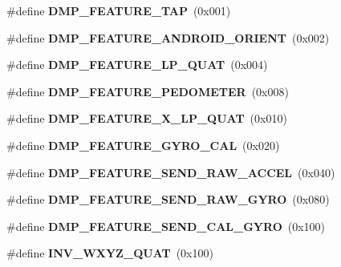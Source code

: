 \begin{DoxyCompactItemize}
\item 
\#define {\bfseries D\+M\+P\+\_\+\+F\+E\+A\+T\+U\+R\+E\+\_\+\+T\+AP}~(0x001)\hypertarget{group___d_r_i_v_e_r_s_ga87fac39cf95e2c56afdf507a986fa00b}{}\label{group___d_r_i_v_e_r_s_ga87fac39cf95e2c56afdf507a986fa00b}

\item 
\#define {\bfseries D\+M\+P\+\_\+\+F\+E\+A\+T\+U\+R\+E\+\_\+\+A\+N\+D\+R\+O\+I\+D\+\_\+\+O\+R\+I\+E\+NT}~(0x002)\hypertarget{group___d_r_i_v_e_r_s_gaf2b250fc928390d562f7bd80300ce419}{}\label{group___d_r_i_v_e_r_s_gaf2b250fc928390d562f7bd80300ce419}

\item 
\#define {\bfseries D\+M\+P\+\_\+\+F\+E\+A\+T\+U\+R\+E\+\_\+\+L\+P\+\_\+\+Q\+U\+AT}~(0x004)\hypertarget{group___d_r_i_v_e_r_s_gabf442c0477f8f7704a8094519ddfe38e}{}\label{group___d_r_i_v_e_r_s_gabf442c0477f8f7704a8094519ddfe38e}

\item 
\#define {\bfseries D\+M\+P\+\_\+\+F\+E\+A\+T\+U\+R\+E\+\_\+\+P\+E\+D\+O\+M\+E\+T\+ER}~(0x008)\hypertarget{group___d_r_i_v_e_r_s_gabcf6a5bc9703782d711d0c6ba92ade85}{}\label{group___d_r_i_v_e_r_s_gabcf6a5bc9703782d711d0c6ba92ade85}

\item 
\#define {\bfseries D\+M\+P\+\_\+\+F\+E\+A\+T\+U\+R\+E\+\_\+X\+\_\+\+L\+P\+\_\+\+Q\+U\+AT}~(0x010)\hypertarget{group___d_r_i_v_e_r_s_gae879a3c9729f9e1be5e6d7c9211c69c0}{}\label{group___d_r_i_v_e_r_s_gae879a3c9729f9e1be5e6d7c9211c69c0}

\item 
\#define {\bfseries D\+M\+P\+\_\+\+F\+E\+A\+T\+U\+R\+E\+\_\+\+G\+Y\+R\+O\+\_\+\+C\+AL}~(0x020)\hypertarget{group___d_r_i_v_e_r_s_gaaf0ac890c1f83106c08b722f1e865fdb}{}\label{group___d_r_i_v_e_r_s_gaaf0ac890c1f83106c08b722f1e865fdb}

\item 
\#define {\bfseries D\+M\+P\+\_\+\+F\+E\+A\+T\+U\+R\+E\+\_\+\+S\+E\+N\+D\+\_\+\+R\+A\+W\+\_\+\+A\+C\+C\+EL}~(0x040)\hypertarget{group___d_r_i_v_e_r_s_ga9eeb257febe4a305df7ad4cf31dc2755}{}\label{group___d_r_i_v_e_r_s_ga9eeb257febe4a305df7ad4cf31dc2755}

\item 
\#define {\bfseries D\+M\+P\+\_\+\+F\+E\+A\+T\+U\+R\+E\+\_\+\+S\+E\+N\+D\+\_\+\+R\+A\+W\+\_\+\+G\+Y\+RO}~(0x080)\hypertarget{group___d_r_i_v_e_r_s_gaa59d3ed6f0cbc66e99ce637546434b34}{}\label{group___d_r_i_v_e_r_s_gaa59d3ed6f0cbc66e99ce637546434b34}

\item 
\#define {\bfseries D\+M\+P\+\_\+\+F\+E\+A\+T\+U\+R\+E\+\_\+\+S\+E\+N\+D\+\_\+\+C\+A\+L\+\_\+\+G\+Y\+RO}~(0x100)\hypertarget{group___d_r_i_v_e_r_s_ga40462c6fd55b04b2f79723dd737ee795}{}\label{group___d_r_i_v_e_r_s_ga40462c6fd55b04b2f79723dd737ee795}

\item 
\#define {\bfseries I\+N\+V\+\_\+\+W\+X\+Y\+Z\+\_\+\+Q\+U\+AT}~(0x100)\hypertarget{group___d_r_i_v_e_r_s_ga3d79cffe845a796a27d03432a1f2ade0}{}\label{group___d_r_i_v_e_r_s_ga3d79cffe845a796a27d03432a1f2ade0}

\end{DoxyCompactItemize}
